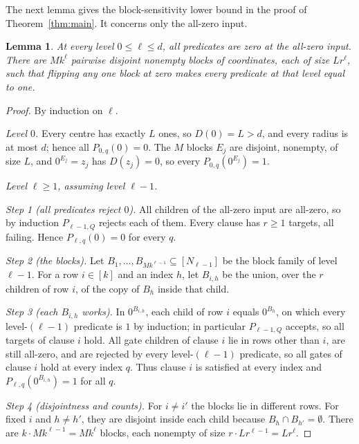 \documentclass[11pt]{article}
\newtheorem{lemma}[theorem]{Lemma}
\theoremstyle{definition}
\theoremstyle{remark}
\begin{document}
The next lemma gives the block-sensitivity lower bound in the proof of
Theorem~\ref{thm:main}. It concerns only the all-zero input.

\begin{lemma}\label{lem:blocks}
At every level \(0\le\ell\le d\), all predicates are zero at the
all-zero input. There are \(Mk^\ell\) pairwise disjoint nonempty blocks
of coordinates, each of size \(Lr^\ell\), such that flipping any one
block at zero makes every predicate at that level equal to one.
\end{lemma}
\begin{proof}
By induction on \(\ell\).

\emph{Level \(0\).} Every centre has exactly \(L\) ones, so \(D(0)=L>d\),
and every radius is at most \(d\); hence all \(P_{0,q}(0)=0\). The \(M\)
blocks \(E_j\) are disjoint, nonempty, of size \(L\), and \(0^{E_j}=z_j\) has
\(D(z_j)=0\), so every \(P_{0,q}(0^{E_j})=1\).

\emph{Level \(\ell\ge1\), assuming level \(\ell-1\).}

\emph{Step 1 (all predicates reject \(0\)).} All children of the all-zero
input are all-zero, so by induction \(P_{\ell-1,Q}\) rejects each of them.
Every clause has \(r\ge1\) targets, all failing. Hence
\(P_{\ell,q}(0)=0\) for every \(q\).

\emph{Step 2 (the blocks).} Let \(B_1,\ldots,B_{Mk^{\ell-1}}\subseteq
[N_{\ell-1}]\) be the block family of level \(\ell-1\). For a row \(i\in[k]\)
and an index \(h\), let \(B_{i,h}\) be the union, over the \(r\) children of
row \(i\), of the copy of \(B_h\) inside that child.

\emph{Step 3 (each \(B_{i,h}\) works).} In \(0^{B_{i,h}}\), each child of row
\(i\) equals \(0^{B_h}\), on which every level-\((\ell-1)\) predicate is
\(1\) by induction; in particular \(P_{\ell-1,Q}\) accepts, so all targets
of clause \(i\) hold. All gate children of clause \(i\) lie in rows other
than \(i\), are still all-zero, and are rejected by every
level-\((\ell-1)\) predicate, so all gates of clause \(i\) hold at every
index \(q\). Thus clause \(i\) is satisfied at every index and
\(P_{\ell,q}(0^{B_{i,h}})=1\) for all \(q\).

\emph{Step 4 (disjointness and counts).} For \(i\ne i'\) the blocks lie in
different rows. For fixed \(i\) and \(h\ne h'\), they are disjoint inside
each child because \(B_h\cap B_{h'}=\emptyset\). There are
\(k\cdot Mk^{\ell-1}=Mk^\ell\) blocks, each nonempty of size
\(r\cdot Lr^{\ell-1}=Lr^\ell\).
\end{proof}
\end{document}
